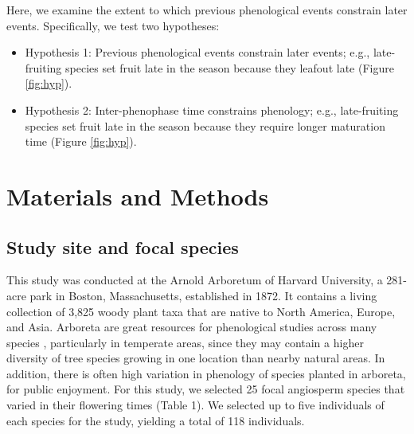 \documentclass{article}
\begin{document}
\par Here, we examine the extent to which previous phenological events constrain later events. Specifically, we test two hypotheses:
\begin{itemize}
\item Hypothesis 1: Previous phenological events constrain later events; e.g., late-fruiting species set fruit late in the season because they leafout late  (Figure \ref{fig:hyp}).
\item Hypothesis 2: Inter-phenophase time  constrains phenology; e.g., late-fruiting species set fruit late in the season because they require longer maturation time (Figure \ref{fig:hyp}).
\end{itemize}

\section* {Materials and Methods}
\subsection*{Study site and focal species}
This study was conducted at the Arnold Arboretum of Harvard University, a 281-acre park in Boston, Massachusetts, established in 1872. It contains a living collection of 3,825 woody plant taxa that are native to North America, Europe, and Asia. Arboreta are great resources for phenological studies across many species \citep{primack2009a}, particularly in temperate areas, since they may contain a higher diversity of tree species growing in one location than nearby natural areas. In addition, there is often high variation in phenology of species planted in arboreta, for public enjoyment. For this study, we selected 25 focal angiosperm species that varied in their flowering times (Table 1). We selected up to five individuals of each species for the study, yielding a total of 118 individuals.
\end{document}
